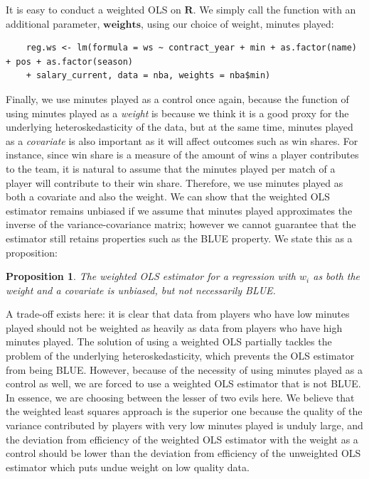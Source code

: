 \documentclass[12pt]{article}
\newtheorem{proposition}{Proposition}
\begin{document}
	It is easy to conduct a weighted OLS on $\textbf{R}$. We simply call the function with an additional parameter, $\textbf{weights}$, using our choice of weight, minutes played:
	
	\begin{lstlisting}
	reg.ws <- lm(formula = ws ~ contract_year + min + as.factor(name) + pos + as.factor(season) 
	+ salary_current, data = nba, weights = nba$min)
	\end{lstlisting}
	
	Finally, we use minutes played as a control once again, because the function of using minutes played as a \emph{weight} is because we think it is a good proxy for the underlying heteroskedasticity of the data, but at the same time, minutes played as a \emph{covariate} is also important as it will affect outcomes such as win shares. For instance, since win share is a measure of the amount of wins a player contributes to the team, it is natural to assume that the minutes played per match of a player will contribute to their win share. Therefore, we use minutes played as both a covariate and also the weight. We can show that the weighted OLS estimator remains unbiased if we assume that minutes played approximates the inverse of the variance-covariance matrix; however we cannot guarantee that the estimator still retains properties such as the BLUE property. We state this as a proposition:
	
	\begin{proposition}
		The weighted OLS estimator for a regression with $w_i$ as both the weight and a covariate is unbiased, but not necessarily BLUE.
	\end{proposition}
	
	A trade-off exists here: it is clear that data from players who have low minutes played should not be weighted as heavily as data from players who have high minutes played. The solution of using a weighted OLS partially tackles the problem of the underlying heteroskedasticity, which prevents the OLS estimator from being BLUE. However, because of the necessity of using minutes played as a control as well, we are forced to use a weighted OLS estimator that is not BLUE. In essence, we are choosing between the lesser of two evils here. We believe that the weighted least squares approach is the superior one because the quality of the variance contributed by players with very low minutes played is unduly large, and the deviation from efficiency of the weighted OLS estimator with the weight as a control should be lower than the deviation from efficiency of the unweighted OLS estimator which puts undue weight on low quality data.
	
\end{document}
